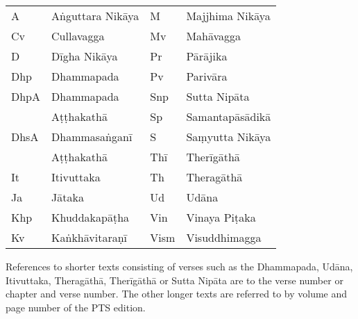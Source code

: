 \clearpage
\thispagestyle{empty}

{}
\bigskip

{\raggedright
\ifhandbookedition
\fontsize{9}{13}\selectfont
\else
\fontsize{10}{14}\selectfont
\fi

\begin{tabular}{@{}llll@{}}
  A    & Aṅguttara Nikāya &  M    & Majjhima Nikāya \\
  Cv   & Cullavagga       &  Mv   & Mahāvagga       \\
  D    & Dīgha Nikāya     &  Pr   & Pārājika        \\
  Dhp  & Dhammapada       &  Pv   & Parivāra        \\
  DhpA & Dhammapada       &  Snp  & Sutta Nipāta    \\
       & Aṭṭhakathā       &  Sp   & Samantapāsādikā \\
  DhsA & Dhammasaṅganī    &  S    & Saṃyutta Nikāya \\
       & Aṭṭhakathā       &  Thī  & Therīgāthā      \\
  It   & Itivuttaka       &  Th   & Theragāthā      \\
  Ja   & Jātaka           &  Ud   & Udāna           \\
  Khp  & Khuddakapāṭha    &  Vin  & Vinaya Piṭaka   \\
  Kv   & Kaṅkhāvitaraṇī   &  Vism & Visuddhimagga   \\
\end{tabular}

\bigskip

References to shorter texts consisting of verses such as the Dhammapada, Udāna,
Itivuttaka, Theragāthā, Therīgāthā or Sutta Nipāta are to the verse number or
chapter and verse number. The other longer texts are referred to by volume and
page number of the PTS edition.

}

